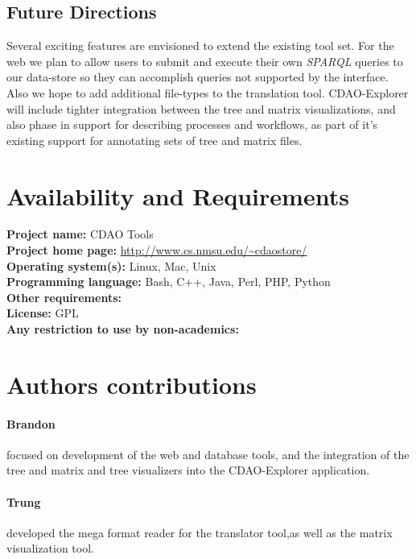 \documentclass[10pt]{bmc_article}
\newenvironment{bmcformat}{\begin{raggedright}\baselineskip20pt\sloppy\setboolean{publ}{false}}{\end{raggedright}\baselineskip20pt\sloppy}
\begin{document}
\begin{bmcformat}
   \subsection*{Future Directions}
     Several exciting features are envisioned to extend the existing tool set. For the web we plan to allow users to submit and execute
     their own \textit{SPARQL} queries to our data-store so they can accomplish queries not supported by the interface. Also we hope to
     add additional file-types to the translation tool. CDAO-Explorer will include tighter integration between the tree and matrix 
     visualizations, and also phase in support for describing processes and workflows, as part of it's existing support for annotating
     sets of tree and matrix files.


  
\section*{Availability and Requirements}
  \textbf{Project name:} CDAO Tools\\
  \textbf{Project home page:} \url{http://www.cs.nmsu.edu/~cdaostore/} \\ 
  \textbf{Operating system(s):} Linux, Mac, Unix \\
  \textbf{Programming language:} Bash, C++, Java, Perl, PHP, Python \\ 
  \textbf{Other requirements:} \\ 
  \textbf{License:} GPL \\ 
  \textbf{Any restriction to use by non-academics:} \\ 

    
\section*{Authors contributions}
    \paragraph*{Brandon} focused on development of the web and database tools, and the integration of the tree and matrix
      and tree visualizers into the CDAO-Explorer application. 
    \paragraph*{Trung} developed the mega format reader for the translator tool,as well as the matrix visualization tool. 

\end{bmcformat}
\end{document}
